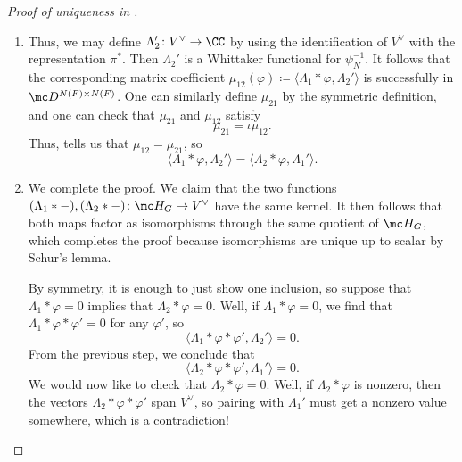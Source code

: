 \documentclass[../notes.tex]{subfiles}
\begin{document}
\begin{proof}[Proof of uniqueness in ]
\begin{enumerate}
		\item Thus, we may define $\Lambda_2'\colon V^\lor\to\CC$ by using the identification of $V^\lor$ with the representation $\pi^*$. Then $\Lambda_2'$ is a Whittaker functional for $\psi_N^{-1}$. It follows that the corresponding matrix coefficient $\mu_{12}(\varphi)\coloneqq\langle\Lambda_1*\varphi,\Lambda_2'\rangle$ is successfully in $\mc D^{N(F)\times N(F)}$. One can similarly define $\mu_{21}$ by the symmetric definition, and one can check that $\mu_{21}$ and $\mu_{12}$ satisfy
		\[\mu_{21}=\iota\mu_{12}.\]
		Thus,  tells us that $\mu_{12}=\mu_{21}$, so
		\[\langle\Lambda_1*\varphi,\Lambda_2'\rangle=\langle\Lambda_2*\varphi,\Lambda_1'\rangle.\]

		\item We complete the proof. We claim that the two functions $(\Lambda_1*-),(\Lambda_2*-)\colon\mc H_G\to V^\lor$ have the same kernel. It then follows that both maps factor as isomorphisms through the same quotient of $\mc H_G$, which completes the proof because isomorphisms are unique up to scalar by Schur's lemma.

		By symmetry, it is enough to just show one inclusion, so suppose that $\Lambda_1*\varphi=0$ implies that $\Lambda_2*\varphi=0$. Well, if $\Lambda_1*\varphi=0$, we find that $\Lambda_1*\varphi*\varphi'=0$ for any $\varphi'$, so
		\[\langle\Lambda_1*\varphi*\varphi',\Lambda_2'\rangle=0.\]
		From the previous step, we conclude that
		\[\langle\Lambda_2*\varphi*\varphi',\Lambda_1'\rangle=0.\]
		We would now like to check that $\Lambda_2*\varphi=0$. Well, if $\Lambda_2*\varphi$ is nonzero, then the vectors $\Lambda_2*\varphi*\varphi'$ span $V^\lor$, so pairing with $\Lambda_1'$ must get a nonzero value somewhere, which is a contradiction!
		\qedhere
	\end{enumerate}
\end{proof}
\end{document}
